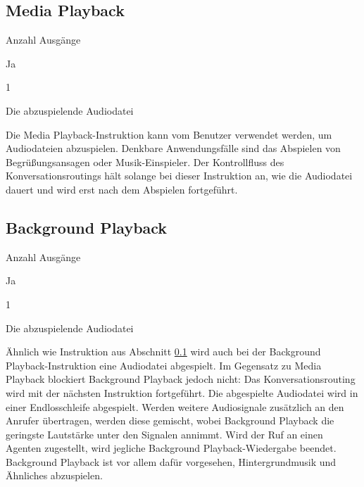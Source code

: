 \subsection{Media Playback}
\label{subsec:Media Playback}
\begin{labeling}{Anzahl Ausgänge}
\item [Eingang] Ja
\item [Anzahl Ausgänge] 1
\item [Parameter] Die abzuspielende Audiodatei
\item [Beschreibung] Die Media Playback-Instruktion kann vom Benutzer verwendet werden, um Audiodateien abzuspielen. Denkbare Anwendungsfälle sind das Abspielen von Begrüßungsansagen oder Musik-Einspieler. Der Kontrollfluss des Konversationsroutings hält solange bei dieser Instruktion an, wie die Audiodatei dauert und wird erst nach dem Abspielen fortgeführt.
\end{labeling}

\subsection{Background Playback}
\begin{labeling}{Anzahl Ausgänge}
\item [Eingang] Ja
\item [Anzahl Ausgänge] 1
\item [Parameter] Die abzuspielende Audiodatei
\item [Beschreibung] Ähnlich wie Instruktion aus Abschnitt \ref{subsec:Media Playback} wird auch bei der Background Playback-Instruktion eine Audiodatei abgespielt. Im Gegensatz zu Media Playback blockiert Background Playback jedoch nicht: Das Konversationsrouting wird mit der nächsten Instruktion fortgeführt. Die abgespielte Audiodatei wird in einer Endlosschleife abgespielt. Werden weitere Audiosignale zusätzlich an den Anrufer übertragen, werden diese gemischt, wobei Background Playback die geringste Lautstärke unter den Signalen annimmt. Wird der Ruf an einen Agenten zugestellt, wird jegliche Background Playback-Wiedergabe beendet. Background Playback ist vor allem dafür vorgesehen, Hintergrundmusik und Ähnliches abzuspielen.
\end{labeling}

